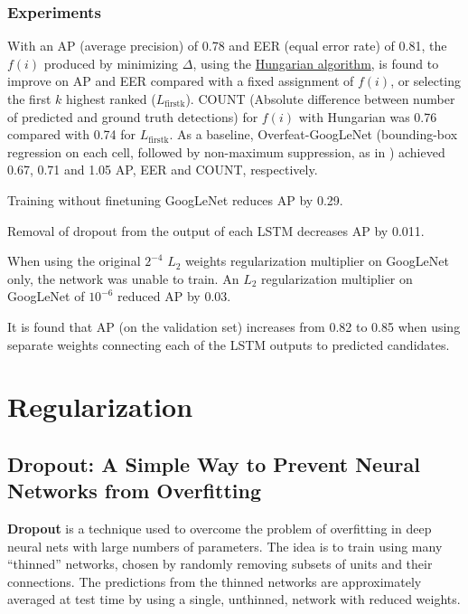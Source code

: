 \documentclass[a4paper, 12pt]{article}
\begin{document}
\subsubsection{Experiments}

With an AP (average precision) of 0.78 and EER (equal error rate) of 0.81, the
$f(i)$ produced by minimizing $\Delta$, using the
\href{https://en.wikipedia.org/wiki/Hungarian_algorithm}{Hungarian algorithm},
is found to improve on AP and EER compared with a fixed assignment of $f(i)$,
or selecting the first $k$ highest ranked ($L_\textrm{firstk}$). COUNT
(Absolute difference between number of predicted and ground truth detections)
for $f(i)$ with Hungarian was 0.76 compared with 0.74 for $L_\textrm{firstk}$.
As a baseline, Overfeat-GoogLeNet (bounding-box regression on each cell,
followed by non-maximum suppression, as in
\citet{DBLP:journals/corr/SermanetEZMFL13}) achieved 0.67, 0.71 and 1.05 AP, EER
and COUNT, respectively.

Training without finetuning GoogLeNet reduces AP by 0.29.

Removal of dropout from the output of each LSTM decreases AP by 0.011.

When using the original $2^{-4}$ $L_2$ weights regularization multiplier on
GoogLeNet only, the network was unable to train.  An $L_2$ regularization
multiplier on GoogLeNet of $10^{-6}$ reduced AP by 0.03.

It is found that AP (on the validation set) increases from 0.82 to 0.85 when
using separate weights connecting each of the LSTM outputs to predicted
candidates.


\section{Regularization}


\subsection{Dropout: A Simple Way to Prevent Neural Networks from
            Overfitting\citet{Srivastava:2014:DSW:2627435.2670313}}
\label{dropout}

\textbf{Dropout} is a technique used to overcome the problem of overfitting in
deep neural nets with large numbers of parameters. The idea is to train using
many ``thinned'' networks, chosen by randomly removing subsets of units and
their connections. The predictions from the thinned networks are approximately
averaged at test time by using a single, unthinned, network with reduced
weights.
\end{document}
